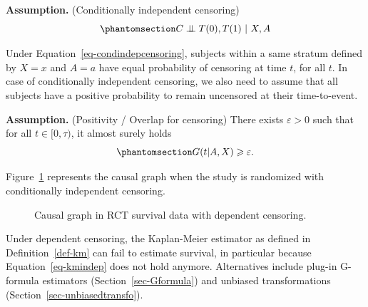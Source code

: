\documentclass[
  11pt,
  a4paper,
]{article}
\theoremstyle{plain}
\theoremstyle{plain}
\theoremstyle{plain}
\theoremstyle{definition}
\theoremstyle{remark}
\begin{document}
\textbf{Assumption.} (Conditionally independent censoring)
\begin{equation}\phantomsection\label{eq-condindepcensoring}{ 
C \perp\mkern-9.5mu\perp T(0),T(1) ~ | ~X,A
}\end{equation}

Under Equation~\ref{eq-condindepcensoring}, subjects within a same
stratum defined by \(X=x\) and \(A=a\) have equal probability of
censoring at time \(t\), for all \(t\). In case of conditionally
independent censoring, we also need to assume that all subjects have a
positive probability to remain uncensored at their time-to-event.

\textbf{Assumption.} (Positivity / Overlap for censoring) There exists
\(\varepsilon> 0\) such that for all \(t\in [0,\tau)\), it almost surely
holds \begin{equation}\phantomsection\label{eq-positivitycensoring}{ 
G(t|A,X) \geqslant\varepsilon.
}\end{equation}

Figure~\ref{fig-RCT_dep_causalgraph} represents the causal graph when
the study is randomized with conditionally independent censoring.

\begin{figure}


\caption{\label{fig-RCT_dep_causalgraph}Causal graph in RCT survival
data with dependent censoring.}

\end{figure}%

Under dependent censoring, the Kaplan-Meier estimator as defined in
Definition~\ref{def-km} can fail to estimate survival, in particular
because Equation~\ref{eq-kmindep} does not hold anymore. Alternatives
include plug-in G-formula estimators (Section~\ref{sec-Gformula}) and
unbiased transformations (Section~\ref{sec-unbiasedtransfo}).
\end{document}
